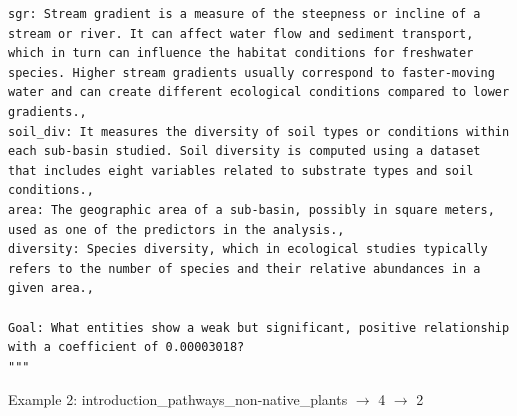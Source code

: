 \begin{verbatim}
sgr: Stream gradient is a measure of the steepness or incline of a stream or river. It can affect water flow and sediment transport, which in turn can influence the habitat conditions for freshwater species. Higher stream gradients usually correspond to faster-moving
water and can create different ecological conditions compared to lower gradients.,
soil_div: It measures the diversity of soil types or conditions within each sub-basin studied. Soil diversity is computed using a dataset that includes eight variables related to substrate types and soil conditions.,
area: The geographic area of a sub-basin, possibly in square meters, used as one of the predictors in the analysis.,
diversity: Species diversity, which in ecological studies typically refers to the number of species and their relative abundances in a given area.,

Goal: What entities show a weak but significant, positive relationship with a coefficient of 0.00003018?
"""
\end{verbatim}

Example 2: introduction\_pathways\_non-native\_plants $\rightarrow$ 4 $\rightarrow$ 2 

